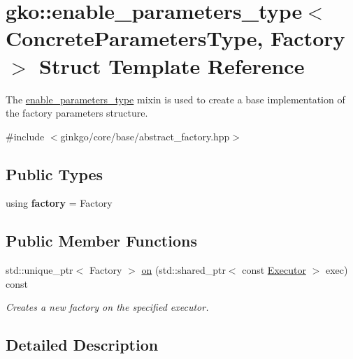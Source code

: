 \hypertarget{structgko_1_1enable__parameters__type}{}\section{gko\+:\+:enable\+\_\+parameters\+\_\+type$<$ Concrete\+Parameters\+Type, Factory $>$ Struct Template Reference}
\label{structgko_1_1enable__parameters__type}


The \hyperlink{structgko_1_1enable__parameters__type}{enable\+\_\+parameters\+\_\+type} mixin is used to create a base implementation of the factory parameters structure.  




{\ttfamily \#include $<$ginkgo/core/base/abstract\+\_\+factory.\+hpp$>$}

\subsection*{Public Types}
\begin{DoxyCompactItemize}
\item 
\mbox{\label{structgko_1_1enable__parameters__type_a0d16b999fffe1aecfbc4824381352268}} 
using {\bfseries factory} = Factory
\end{DoxyCompactItemize}
\subsection*{Public Member Functions}
\begin{DoxyCompactItemize}
\item 
std\+::unique\+\_\+ptr$<$ Factory $>$ \hyperlink{structgko_1_1enable__parameters__type_a07bc1963e83201576761e013f22ce621}{on} (std\+::shared\+\_\+ptr$<$ const \hyperlink{classgko_1_1Executor}{Executor} $>$ exec) const
\begin{DoxyCompactList}\small\item\em Creates a new factory on the specified executor. \end{DoxyCompactList}\end{DoxyCompactItemize}


\subsection{Detailed Description}
